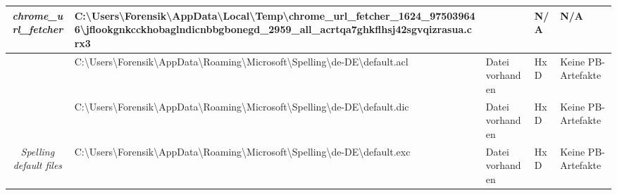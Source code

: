 \begin{appendices}
{\begin{landscape}
\begin{table}[h!]
{\begin{tabular}{cllll}
		\multicolumn{1}{|c|}{\multirow{-6}{*}{\textit{chrome\_url\_fetcher}}}    & \multicolumn{1}{l|}{\cellcolor[HTML]{3190FF}C:\textbackslash{}Users\textbackslash{}Forensik\textbackslash{}AppData\textbackslash{}Local\textbackslash{}Temp\textbackslash{}chrome\_url\_fetcher\_1624\_975039646\textbackslash{}jflookgnkcckhobaglndicnbbgbonegd\_2959\_all\_acrtqa7ghkflhsj42sgvqizrasua.crx3}                          & \multicolumn{1}{l|}{\cellcolor[HTML]{963400}{\color[HTML]{FFFFFF} Datei nicht wiederherstellbar}}   & \multicolumn{1}{l|}{\cellcolor[HTML]{C0C0C0}N/A}           & \multicolumn{1}{l|}{\cellcolor[HTML]{C0C0C0}N/A}                \\ \hline
		\multicolumn{1}{|c|}{}                                                   & \multicolumn{1}{l|}{\cellcolor[HTML]{3190FF}C:\textbackslash{}Users\textbackslash{}Forensik\textbackslash{}AppData\textbackslash{}Roaming\textbackslash{}Microsoft\textbackslash{}Spelling\textbackslash{}de-DE\textbackslash{}default.acl}                                                                                              & \multicolumn{1}{l|}{\cellcolor[HTML]{009901}Datei vorhanden}                                        & \multicolumn{1}{l|}{HxD}                                   & \multicolumn{1}{l|}{\cellcolor[HTML]{F8A102}Keine PB-Artefakte} \\ \cline{2-5} 
		\multicolumn{1}{|c|}{}                                                   & \multicolumn{1}{l|}{\cellcolor[HTML]{3190FF}C:\textbackslash{}Users\textbackslash{}Forensik\textbackslash{}AppData\textbackslash{}Roaming\textbackslash{}Microsoft\textbackslash{}Spelling\textbackslash{}de-DE\textbackslash{}default.dic}                                                                                              & \multicolumn{1}{l|}{\cellcolor[HTML]{009901}Datei vorhanden}                                        & \multicolumn{1}{l|}{HxD}                                   & \multicolumn{1}{l|}{\cellcolor[HTML]{F8A102}Keine PB-Artefakte} \\ \cline{2-5} 
		\multicolumn{1}{|c|}{\multirow{-3}{*}{\textit{Spelling default files}}}  & \multicolumn{1}{l|}{\cellcolor[HTML]{3190FF}C:\textbackslash{}Users\textbackslash{}Forensik\textbackslash{}AppData\textbackslash{}Roaming\textbackslash{}Microsoft\textbackslash{}Spelling\textbackslash{}de-DE\textbackslash{}default.exc}                                                                                              & \multicolumn{1}{l|}{\cellcolor[HTML]{009901}Datei vorhanden}                                        & \multicolumn{1}{l|}{HxD}                                   & \multicolumn{1}{l|}{\cellcolor[HTML]{F8A102}Keine PB-Artefakte} \\ \hline

\end{tabular}}
\end{table}
\end{landscape}}
\end{appendices}
